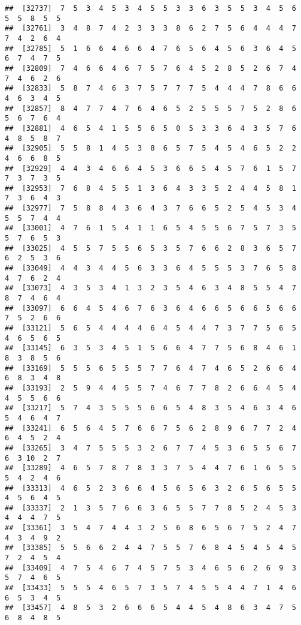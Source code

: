 \documentclass[
]{book}
\begin{document}
\begin{verbatim}
##  [32737]  7  5  3  4  5  3  4  5  5  3  3  6  3  5  5  3  4  5  6  5  5  8  5  5
##  [32761]  3  4  8  7  4  2  3  3  3  8  6  2  7  5  6  4  4  4  7  7  4  2  6  4
##  [32785]  5  1  6  6  4  6  6  4  7  6  5  6  4  5  6  3  6  4  5  6  7  4  7  5
##  [32809]  7  4  6  6  4  6  7  5  7  6  4  5  2  8  5  2  6  7  4  7  4  6  2  6
##  [32833]  5  8  7  4  6  3  7  5  7  7  7  5  4  4  4  7  8  6  6  4  6  3  4  5
##  [32857]  8  4  7  7  4  7  6  4  6  5  2  5  5  5  7  5  2  8  6  5  6  7  6  4
##  [32881]  4  6  5  4  1  5  5  6  5  0  5  3  3  6  4  3  5  7  6  4  8  5  8  7
##  [32905]  5  5  8  1  4  5  3  8  6  5  7  5  4  5  4  6  5  2  2  4  6  6  8  5
##  [32929]  4  4  3  4  6  6  4  5  3  6  6  5  4  5  7  6  1  5  7  7  3  7  3  5
##  [32953]  7  6  8  4  5  5  1  3  6  4  3  3  5  2  4  4  5  8  1  7  3  6  4  3
##  [32977]  7  5  8  8  4  3  6  4  3  7  6  6  5  2  5  4  5  3  4  5  5  7  4  4
##  [33001]  4  7  6  1  5  4  1  1  6  5  4  5  5  6  7  5  7  3  5  5  7  6  5  3
##  [33025]  4  5  5  7  5  5  6  5  3  5  7  6  6  2  8  3  6  5  7  6  2  5  3  6
##  [33049]  4  4  3  4  4  5  6  3  3  6  4  5  5  5  3  7  6  5  8  4  7  6  2  4
##  [33073]  4  3  5  3  4  1  3  2  3  5  4  6  3  4  8  5  5  4  7  8  7  4  6  4
##  [33097]  6  6  4  5  4  6  7  6  3  6  4  6  6  5  6  6  5  6  6  7  5  2  6  6
##  [33121]  5  6  5  4  4  4  4  6  4  5  4  4  7  3  7  7  5  6  5  4  6  5  6  5
##  [33145]  6  3  5  3  4  5  1  5  6  6  4  7  7  5  6  8  4  6  1  8  3  8  5  6
##  [33169]  5  5  5  6  5  5  5  7  7  6  4  7  4  6  5  2  6  6  4  6  8  3  4  8
##  [33193]  2  5  9  4  4  5  5  7  4  6  7  7  8  2  6  6  4  5  4  4  5  5  6  6
##  [33217]  5  7  4  3  5  5  5  6  6  5  4  8  3  5  4  6  3  4  6  5  4  6  4  7
##  [33241]  6  5  6  4  5  7  6  6  7  5  6  2  8  9  6  7  7  2  4  6  4  5  2  4
##  [33265]  3  4  7  5  5  5  3  2  6  7  7  4  5  3  6  5  5  6  7  6  3 10  2  7
##  [33289]  4  6  5  7  8  7  8  3  3  7  5  4  4  7  6  1  6  5  5  5  4  2  4  6
##  [33313]  4  6  5  2  3  6  6  4  5  6  5  6  3  2  6  5  6  5  5  4  5  6  4  5
##  [33337]  2  1  3  5  7  6  6  3  6  5  5  7  7  8  5  2  4  5  3  4  4  4  7  5
##  [33361]  3  5  4  7  4  4  3  2  5  6  8  6  5  6  7  5  2  4  7  4  3  4  9  2
##  [33385]  5  5  6  6  2  4  4  7  5  5  7  6  8  4  5  4  5  4  5  7  2  4  5  4
##  [33409]  4  7  5  4  6  7  4  5  7  5  3  4  6  5  6  2  6  9  3  5  7  4  6  5
##  [33433]  5  5  5  4  6  5  7  3  5  7  4  5  5  4  4  7  1  4  6  6  5  3  4  5
##  [33457]  4  8  5  3  2  6  6  6  5  4  4  5  4  8  6  3  4  7  5  6  8  4  8  5

\end{verbatim}
\end{document}
